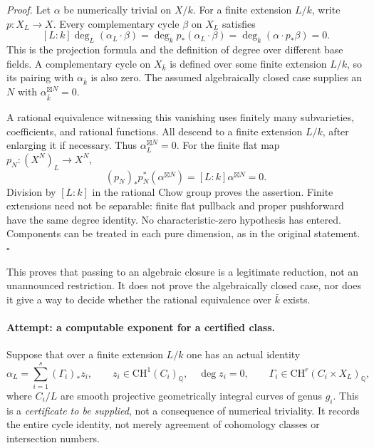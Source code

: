 \documentclass[11pt,a4paper]{article}
\newcommand{\Q}{\mathbb{Q}}
\numberwithin{equation}{section}
\begin{document}
\textit{Proof.} Let $\alpha$ be numerically trivial on $X/k$. For a finite
extension $L/k$, write $p:X_L\to X$. Every complementary cycle $\beta$ on
$X_L$ satisfies
\[
 [L:k]\deg_L(\alpha_L\cdot\beta)
   =\deg_k p_*(\alpha_L\cdot\beta)
   =\deg_k(\alpha\cdot p_*\beta)=0.
\]
This is the projection formula and the definition of degree over different
base fields. A complementary cycle on $X_{\bar k}$ is defined over some
finite extension $L/k$, so its pairing with $\alpha_{\bar k}$ is also zero.
The assumed algebraically closed case supplies an $N$ with
$\alpha_{\bar k}^{\boxtimes N}=0$.

A rational equivalence witnessing this vanishing uses finitely many
subvarieties, coefficients, and rational functions. All descend to a finite
extension $L/k$, after enlarging it if necessary. Thus
$\alpha_L^{\boxtimes N}=0$. For the finite flat map
$p_N:(X^N)_L\to X^N$,
\[
       (p_N)_*p_N^*(\alpha^{\boxtimes N})
                          =[L:k]\alpha^{\boxtimes N}=0.
\]
Division by $[L:k]$ in the rational Chow group proves the assertion.
Finite extensions need not be separable: finite flat pullback and proper
pushforward have the same degree identity. No characteristic-zero
hypothesis has entered. Components can be treated in each pure dimension,
as in the original statement. \hfill$\square$

This proves that passing to an algebraic closure is a legitimate reduction,
not an unannounced restriction. It does not prove the algebraically closed
case, nor does it give a way to decide whether the rational equivalence
over $\bar k$ exists.

\paragraph{Attempt: a computable exponent for a certified class.}
Suppose that over a finite extension $L/k$ one has an actual identity
\begin{equation}\label{eq182-certificate}
 \alpha_L=\sum_{i=1}^s(\Gamma_i)_*z_i,
 \qquad z_i\in\mathrm{CH}^1(C_i)_{\Q},\quad\deg z_i=0,
 \qquad \Gamma_i\in\mathrm{CH}^r(C_i\times X_L)_{\Q},
\end{equation}
where $C_i/L$ are smooth projective geometrically integral curves of
genus $g_i$. This is a \emph{certificate to be supplied}, not a consequence
of numerical triviality. It records the entire cycle identity, not merely
agreement of cohomology classes or intersection numbers.
\end{document}
